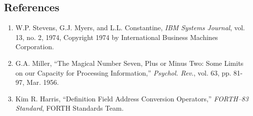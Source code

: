 \subsection{References}
	
\begin{enumerate}
\item W.P. Stevens, G.J. Myers, and L.L. Constantine, \textit{ IBM Systems Journal}, vol. 13, no. 2, 1974, Copyright 1974 by International Business Machines Corporation.
\item G.A. Miller, ``The Magical Number Seven, Plus or Minus Two: Some Limits on our Capacity for Processing Information,'' \textit{Psychol. Rev}., vol. 63, pp. 81-97, Mar. 1956.
\item Kim R. Harris, ``Definition Field Address Conversion Operators,'' \textit{FORTH--83 Standard}, FORTH Standards Team.
\end{enumerate}

